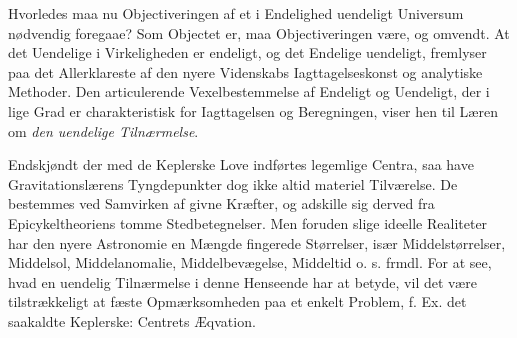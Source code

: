 \documentclass[12pt,a4paper]{book}
\begin{document}
Hvorledes maa nu Objectiveringen af et i Endelighed uendeligt
Universum nødvendig foregaae? Som Objectet er, maa Objectiveringen
være, og omvendt. At det Uendelige i Virkeligheden er endeligt, og det
Endelige uendeligt, fremlyser paa det Allerklareste af den nyere
Videnskabs Iagttagelseskonst og analytiske Methoder. Den articulerende
Vexelbestemmelse af Endeligt og Uendeligt, der i lige Grad er
charakteristisk for Iagttagelsen og Beregningen, viser hen til Læren om
\emph{den uendelige Tilnærmelse}.

Endskjøndt der med de Keplerske Love indførtes legemlige Centra, saa
have Gravitationslærens Tyngdepunkter dog ikke altid materiel
Tilværelse. De bestemmes ved Samvirken af givne Kræfter, og adskille
sig derved fra Epicykeltheoriens tomme Stedbetegnelser. Men foruden
slige ideelle Realiteter har den nyere Astronomie en Mængde fingerede
Størrelser, især Middelstørrelser, Middelsol, Middelanomalie,
Middelbevægelse, Middeltid o. s. frmdl. For at see, hvad en uendelig
Tilnærmelse i denne Henseende har at betyde, vil det være tilstrækkeligt
at fæste Opmærksomheden paa et enkelt Problem, f. Ex. det saakaldte
Keplerske: Centrets Æqvation.
\end{document}
